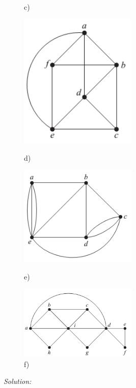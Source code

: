 \documentclass[a4paper]{article}
\begin{document}
\begin{figure}[H]
\begin{minipage}{0.5\textwidth}
			\caption*{c)}
		\end{minipage}
		\begin{minipage}{0.5\textwidth}
			\centering
			\includegraphics[width=0.5\textwidth]{tut912_4.png}
			\caption*{d)}
		\end{minipage}
		\begin{minipage}{0.5\textwidth}
			\centering
			\includegraphics[width=0.5\textwidth]{tut912_5.png}
			\caption*{e)}
		\end{minipage}
		\begin{minipage}{0.5\textwidth}
			\centering
			\includegraphics[width=0.5\textwidth]{tut912_6.png}
			\caption*{f)}
		\end{minipage}
	\end{figure}
	\emph{Solution:}
\end{document}
